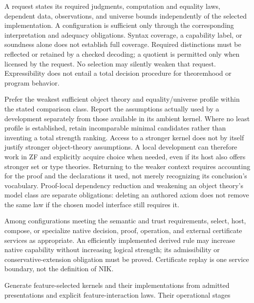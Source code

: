 \documentclass[11pt]{article}
\theoremstyle{definition}
\theoremstyle{remark}
\begin{document}
\begin{description}[leftmargin=1.2cm,style=nextline]
\item[KG1: Semantic coverage.]
  A request states its required judgments, computation and equality laws,
  dependent data, observations, and universe bounds independently of the
  selected implementation. A configuration is sufficient only through the
  corresponding interpretation and adequacy obligations. Syntax coverage,
  a capability label, or soundness alone does not establish full coverage.
  Required distinctions must be reflected or retained by a checked decoding;
  a quotient is permitted only when licensed by the request. No selection may
  silently weaken that request. Expressibility does not entail a total decision
  procedure for theoremhood or program behavior.
\item[KG2: Minimal logical commitments.]
  Prefer the weakest sufficient object theory and equality/universe profile
  within the stated comparison class. Report the assumptions actually used
  by a development separately from those available in its ambient kernel.
  Where no least profile is established, retain incomparable minimal
  candidates rather than inventing a total strength ranking. Access to a
  stronger kernel does not by itself justify stronger object-theory assumptions.
  A local development can therefore work in ZF and explicitly acquire choice
  when needed, even if its host also offers stronger set or type theories.
  Returning to the weaker context requires accounting for the proof and the
  declarations it used, not merely recognizing its conclusion's vocabulary.
  Proof-local dependency reduction and weakening an object theory's model
  class are separate obligations: deleting an authored axiom does not remove
  the same law if the chosen model interface still requires it.
\item[KG3: Appropriate native capabilities.]
  Among configurations meeting the semantic and trust requirements, select,
  host, compose, or specialize native decision, proof, operation, and external
  certificate services as appropriate. An efficiently implemented derived rule
  may increase native capability without increasing logical strength; its
  admissibility or conservative-extension obligation must be proved.
  Certificate replay is one service boundary, not the definition of NIK.
\item[KG4: Checked kernel generation.]
  Generate feature-selected kernels and their implementations from admitted
  presentations and explicit feature-interaction laws. Their operational stages

\end{description}
\end{document}
